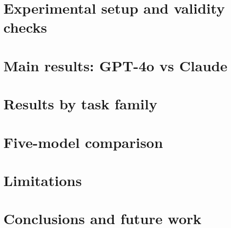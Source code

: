 \documentclass[11pt,a4paper]{article}
\begin{document}
\section{Experimental setup and validity checks}

\section{Main results: GPT-4o vs Claude}

\section{Results by task family}

\section{Five-model comparison}

\section{Limitations}

\section{Conclusions and future work}
\end{document}
